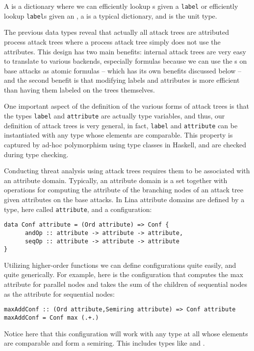 \noindent
A  is a dictionary where we can efficiently lookup
s given a \verb!label! or efficiently lookup \verb!label!s given an
, a  is a typical dictionary, and \mh{()} is the unit
type.

The previous data types reveal that actually all attack trees are
attributed process attack trees where a process attack tree simply
does not use the attributes.  This design has two main benefits:
internal attack trees are very easy to translate to various backends,
especially formulas because we can use the s on base attacks as
atomic formulas -- which has its own benefits discussed below -- and the
second benefit is that modifying labels and attributes is more
efficient than having them labeled on the trees themselves.

One important aspect of the definition of the various forms of attack
trees is that the types \verb!label! and \verb!attribute! are actually
type variables, and thus, our definition of attack trees is very
general, in fact, \verb!label! and \verb!attribute! can be
instantiated with any type whose elements are comparable.  This
property is captured by ad-hoc polymorphism using type classes in
Haskell, and are checked during type checking.

Conducting threat analysis using attack trees requires them to be
associated with an attribute domain.  Typically, an attribute domain
is a set together with operations for computing the attribute of the
branching nodes of an attack tree given attributes on the base
attacks.  In Lina attribute domains are defined by a type, here called
\verb!attribute!, and a configuration:
\begin{center}
  \begin{verbatim}
data Conf attribute = (Ord attribute) => Conf {
      andOp :: attribute -> attribute -> attribute,
      seqOp :: attribute -> attribute -> attribute
}
\end{verbatim}
\end{center}
Utilizing higher-order functions we can define configurations quite
easily, and quite generically.  For example, here is the configuration
that computes the max attribute for parallel nodes and takes the sum
of the children of sequential nodes as the attribute for sequential
nodes:
\begin{center}
  \begin{verbatim}
maxAddConf :: (Ord attribute,Semiring attribute) => Conf attribute
maxAddConf = Conf max (.+.)
\end{verbatim}
\end{center}
Notice here that this configuration will work with any type at all
whose elements are comparable and form a semiring.  This includes
types like  and .

